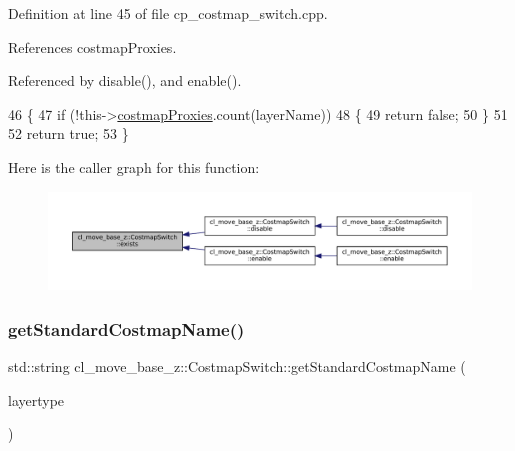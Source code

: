 Definition at line 45 of file cp\+\_\+costmap\+\_\+switch.\+cpp.



References costmap\+Proxies.



Referenced by disable(), and enable().


\begin{DoxyCode}
46 \{
47     \textcolor{keywordflow}{if} (!this->\hyperlink{classcl__move__base__z_1_1CostmapSwitch_a3a574ac1f7f3eff19cdf7ad0e15297e4}{costmapProxies}.count(layerName))
48     \{
49         \textcolor{keywordflow}{return} \textcolor{keyword}{false};
50     \}
51 
52     \textcolor{keywordflow}{return} \textcolor{keyword}{true};
53 \}
\end{DoxyCode}
Here is the caller graph for this function\+:
\nopagebreak
\begin{figure}[H]
\begin{center}
\leavevmode
\includegraphics[width=350pt]{classcl__move__base__z_1_1CostmapSwitch_ae9cfc1152e625763beb7997c5dbed70b_icgraph}
\end{center}
\end{figure}
\mbox{\label{classcl__move__base__z_1_1CostmapSwitch_ac46796874242fdaa7efef86b66a55102}} 
\subsubsection{\texorpdfstring{get\+Standard\+Costmap\+Name()}{getStandardCostmapName()}}
{\footnotesize\ttfamily std\+::string cl\+\_\+move\+\_\+base\+\_\+z\+::\+Costmap\+Switch\+::get\+Standard\+Costmap\+Name (\begin{DoxyParamCaption}\item[{\hyperlink{classcl__move__base__z_1_1CostmapSwitch_af38aeee5e3893e689cd74ddddfe0df15}{Standard\+Layers}}]{layertype }\end{DoxyParamCaption})\hspace{0.3cm}{\ttfamily [static]}}




